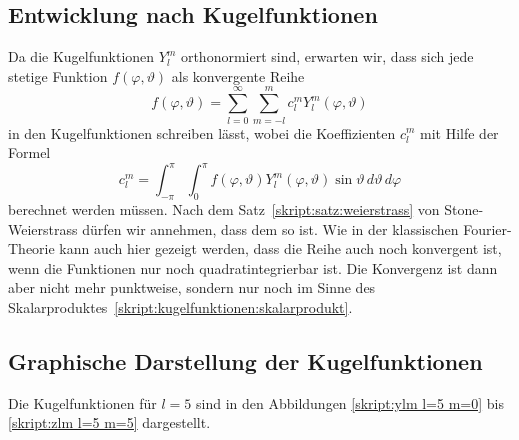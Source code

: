 \subsection{Entwicklung nach Kugelfunktionen}
Da die Kugelfunktionen $Y^m_l$ orthonormiert sind, erwarten wir, dass sich 
jede stetige Funktion $f(\varphi,\vartheta)$ als konvergente Reihe
\begin{equation}
f(\varphi,\vartheta)
=
\sum_{l=0}^\infty
\sum_{m=-l}^m c_l^m Y_l^m(\varphi,\vartheta)
\end{equation}
in den Kugelfunktionen schreiben lässt, wobei die
Koeffizienten $c_l^m$
mit Hilfe der Formel
\begin{equation}
c_l^m
=
\int_{-\pi}^\pi
\int_0^\pi
f(\varphi,\vartheta)Y^m_l(\varphi,\vartheta)
\sin\vartheta
\,d\vartheta
\,d\varphi
\end{equation}
berechnet werden müssen.
Nach dem Satz~\ref{skript:satz:weierstrass} von Stone-Weierstrass
dürfen wir annehmen, dass dem so ist.
Wie in der klassischen Fourier-Theorie kann auch hier gezeigt werden,
dass die Reihe auch noch konvergent ist, wenn die Funktionen nur noch
quadratintegrierbar ist.
Die Konvergenz ist dann aber nicht mehr punktweise, sondern nur noch
im Sinne des Skalarproduktes~\eqref{skript:kugelfunktionen:skalarprodukt}.

\subsection{Graphische Darstellung der Kugelfunktionen}
Die Kugelfunktionen für $l=5$ sind in den Abbildungen
\ref{skript:ylm l=5 m=0} bis \ref{skript:zlm l=5 m=5}
dargestellt.

